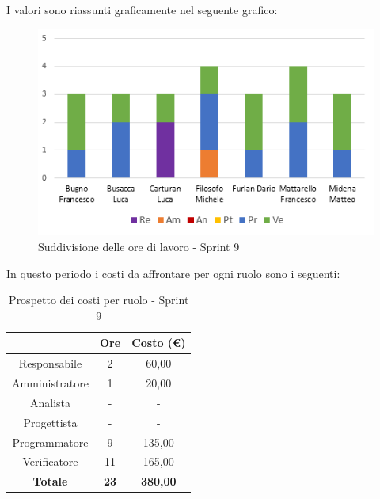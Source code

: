 I valori sono riassunti graficamente nel seguente grafico:

\begin{figure}[H]
  \centering
  \includegraphics[scale=1.0]{immagini/9Sprint_oreLavoro.png}
  \caption{Suddivisione delle ore di lavoro - Sprint 9}
\end{figure}

\pagebreak
In questo periodo i costi da affrontare per ogni ruolo sono i seguenti:

\begin{table}[H]
  \centering
  \renewcommand{\arraystretch}{1.8}
  \begin{tabular}{c|c|c}
    \rowcolor[HTML]{125E28}
    \multicolumn{1}{c}{\color[HTML]{FFFFFF}\textbf{Ruolo}}
                    & \multicolumn{1}{c}{\color[HTML]{FFFFFF}\textbf{Ore}}
                    & \multicolumn{1}{c}{\color[HTML]{FFFFFF}\textbf{Costo (€)}}                   \\
    \hline
    Responsabile    & 2                                                          & 60,00           \\
    Amministratore  & 1                                                          & 20,00           \\
    Analista        & -                                                          & -               \\
    Progettista     & -                                                          & -               \\
    Programmatore   & 9                                                          & 135,00          \\
    Verificatore    & 11                                                         & 165,00          \\
    \textbf{Totale} & \textbf{23}                                                & \textbf{380,00}
  \end{tabular}
  \caption{Prospetto dei costi per ruolo - Sprint 9}
\end{table}

